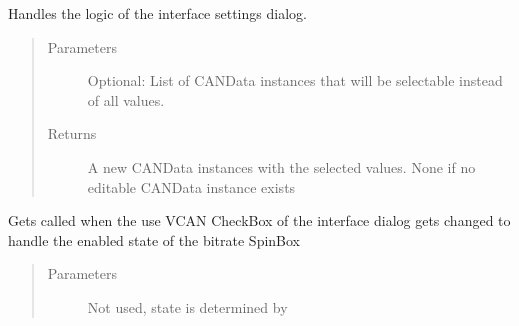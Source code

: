 \documentclass[letterpaper,10pt,english]{sphinxmanual}
\begin{document}
\begin{fulllineitems}
\begin{fulllineitems}
\end{fulllineitems}


\begin{fulllineitems}
\label{\detokenize{src:src.Toolbox.Toolbox.interfaceSettingsDialog}}
Handles the logic of the interface settings dialog.
\begin{quote}\begin{description}
\item[{Parameters}] \leavevmode
{} \textendash{} Optional: List of CANData instances that will be selectable instead of all values.

\item[{Returns}] \leavevmode
A new CANData instances with the selected values. None if no editable CANData instance exists

\end{description}\end{quote}

\end{fulllineitems}


\begin{fulllineitems}
\label{\detokenize{src:src.Toolbox.Toolbox.interfaceSettingsDialogCheckBoxChanged}}
Gets called when the use VCAN CheckBox of the interface dialog gets changed to
handle the enabled state of the bitrate SpinBox
\begin{quote}\begin{description}
\item[{Parameters}] \leavevmode
{} \textendash{} Not used, state is determined by 

\end{description}\end{quote}

\end{fulllineitems}



\end{fulllineitems}
\end{document}
